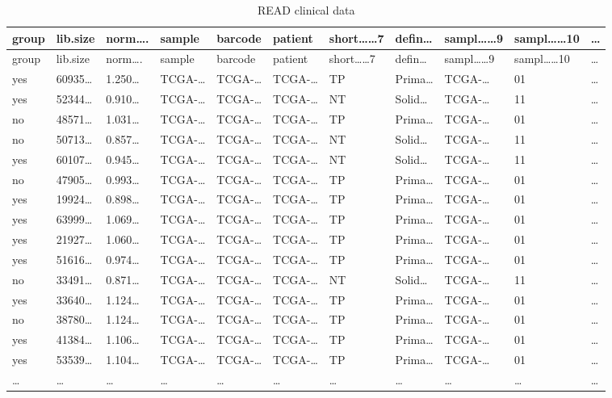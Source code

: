 \documentclass[
]{article}
\begin{document}
\begin{longtable}[]{@{}lllllllllll@{}}
\caption{\label{tab:READ-clinical-data}READ clinical data}\tabularnewline
\toprule
group & lib.size & norm\ldots. & sample & barcode & patient & short\ldots\ldots7 & defin\ldots{} & sampl\ldots\ldots9 & sampl\ldots\ldots10 & \ldots{}\tabularnewline
\midrule
\endfirsthead
\toprule
group & lib.size & norm\ldots. & sample & barcode & patient & short\ldots\ldots7 & defin\ldots{} & sampl\ldots\ldots9 & sampl\ldots\ldots10 & \ldots{}\tabularnewline
\midrule
\endhead
yes & 60935\ldots{} & 1.250\ldots{} & TCGA-\ldots{} & TCGA-\ldots{} & TCGA-\ldots{} & TP & Prima\ldots{} & TCGA-\ldots{} & 01 & \ldots{}\tabularnewline
yes & 52344\ldots{} & 0.910\ldots{} & TCGA-\ldots{} & TCGA-\ldots{} & TCGA-\ldots{} & NT & Solid\ldots{} & TCGA-\ldots{} & 11 & \ldots{}\tabularnewline
no & 48571\ldots{} & 1.031\ldots{} & TCGA-\ldots{} & TCGA-\ldots{} & TCGA-\ldots{} & TP & Prima\ldots{} & TCGA-\ldots{} & 01 & \ldots{}\tabularnewline
no & 50713\ldots{} & 0.857\ldots{} & TCGA-\ldots{} & TCGA-\ldots{} & TCGA-\ldots{} & NT & Solid\ldots{} & TCGA-\ldots{} & 11 & \ldots{}\tabularnewline
yes & 60107\ldots{} & 0.945\ldots{} & TCGA-\ldots{} & TCGA-\ldots{} & TCGA-\ldots{} & NT & Solid\ldots{} & TCGA-\ldots{} & 11 & \ldots{}\tabularnewline
no & 47905\ldots{} & 0.993\ldots{} & TCGA-\ldots{} & TCGA-\ldots{} & TCGA-\ldots{} & TP & Prima\ldots{} & TCGA-\ldots{} & 01 & \ldots{}\tabularnewline
yes & 19924\ldots{} & 0.898\ldots{} & TCGA-\ldots{} & TCGA-\ldots{} & TCGA-\ldots{} & TP & Prima\ldots{} & TCGA-\ldots{} & 01 & \ldots{}\tabularnewline
yes & 63999\ldots{} & 1.069\ldots{} & TCGA-\ldots{} & TCGA-\ldots{} & TCGA-\ldots{} & TP & Prima\ldots{} & TCGA-\ldots{} & 01 & \ldots{}\tabularnewline
yes & 21927\ldots{} & 1.060\ldots{} & TCGA-\ldots{} & TCGA-\ldots{} & TCGA-\ldots{} & TP & Prima\ldots{} & TCGA-\ldots{} & 01 & \ldots{}\tabularnewline
yes & 51616\ldots{} & 0.974\ldots{} & TCGA-\ldots{} & TCGA-\ldots{} & TCGA-\ldots{} & TP & Prima\ldots{} & TCGA-\ldots{} & 01 & \ldots{}\tabularnewline
no & 33491\ldots{} & 0.871\ldots{} & TCGA-\ldots{} & TCGA-\ldots{} & TCGA-\ldots{} & NT & Solid\ldots{} & TCGA-\ldots{} & 11 & \ldots{}\tabularnewline
yes & 33640\ldots{} & 1.124\ldots{} & TCGA-\ldots{} & TCGA-\ldots{} & TCGA-\ldots{} & TP & Prima\ldots{} & TCGA-\ldots{} & 01 & \ldots{}\tabularnewline
no & 38780\ldots{} & 1.124\ldots{} & TCGA-\ldots{} & TCGA-\ldots{} & TCGA-\ldots{} & TP & Prima\ldots{} & TCGA-\ldots{} & 01 & \ldots{}\tabularnewline
yes & 41384\ldots{} & 1.106\ldots{} & TCGA-\ldots{} & TCGA-\ldots{} & TCGA-\ldots{} & TP & Prima\ldots{} & TCGA-\ldots{} & 01 & \ldots{}\tabularnewline
yes & 53539\ldots{} & 1.104\ldots{} & TCGA-\ldots{} & TCGA-\ldots{} & TCGA-\ldots{} & TP & Prima\ldots{} & TCGA-\ldots{} & 01 & \ldots{}\tabularnewline
\ldots{} & \ldots{} & \ldots{} & \ldots{} & \ldots{} & \ldots{} & \ldots{} & \ldots{} & \ldots{} & \ldots{} & \ldots{}\tabularnewline
\bottomrule
\end{longtable}
\end{document}
